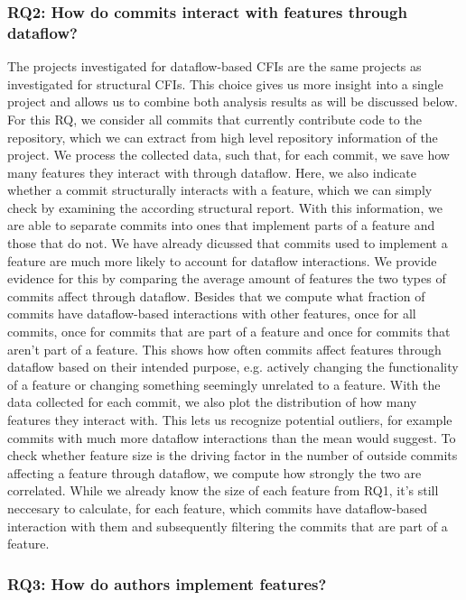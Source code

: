 \subsubsection*{\textbf{RQ2: How do commits interact with features through dataflow?}}

The projects investigated for dataflow-based CFIs are the same projects as investigated for structural CFIs.
This choice gives us more insight into a single project and allows us to combine both analysis results as will be discussed below.
For this RQ, we consider all commits that currently contribute code to the repository, 
which we can extract from high level repository information of the project.
We process the collected data, such that, for each commit, we save how many features they interact with through dataflow.
Here, we also indicate whether a commit structurally interacts with a feature, which we can simply check by examining the according structural report.
With this information, we are able to separate commits into ones that implement parts of a feature and those that do not. 
We have already dicussed that commits used to implement a feature are much more likely to account for dataflow interactions.
We provide evidence for this by comparing the average amount of features the two types of commits affect through dataflow. 
Besides that we compute what fraction of commits have dataflow-based interactions with other features, once for all commits, once for commits that are part of a feature and once for commits that aren't part of a feature.
This shows how often commits affect features through dataflow based on their intended purpose, e.g. actively changing the functionality of a feature or changing something seemingly unrelated to a feature. 
With the data collected for each commit, we also plot the distribution of how many features they interact with.
This lets us recognize potential outliers, for example commits with much more dataflow interactions than the mean would suggest.
To check whether feature size is the driving factor in the number of outside commits affecting a feature through dataflow, we compute how strongly the two are correlated.
While we already know the size of each feature from RQ1, it's still neccesary to calculate, for each feature, which commits have dataflow-based interaction with them and subsequently filtering the commits that are part of a feature.

\subsubsection*{\textbf{RQ3: How do authors implement features?}}

